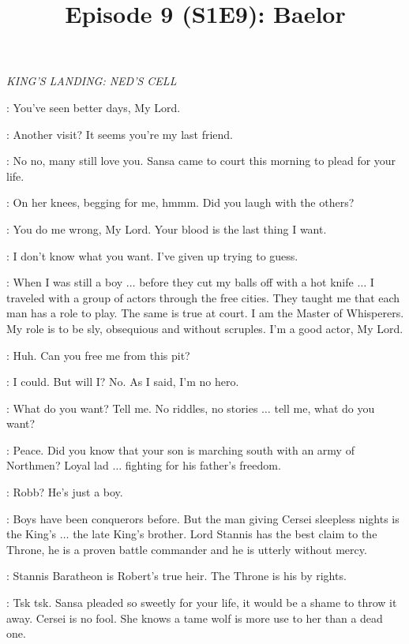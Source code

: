

\title{Episode 9 (S1E9): Baelor}
\author{}
\date{}
\maketitle




\scene

\textit{KING'S LANDING: NED'S CELL} 


\VARYS: You've seen better days, My Lord. 

\NED: Another visit? It seems you're my last friend. 

\VARYS: No no, many still love you. Sansa came to court this morning to plead for your life. 

\NED: On her knees, begging for me, hmmm. Did you laugh with the others? 

\VARYS: You do me wrong, My Lord. Your blood is the last thing I want. 

\NED: I don't know what you want. I've given up trying to guess. 

\VARYS: When I was still a boy $\ldots$ before they cut my balls off with a hot knife $\ldots$  I traveled with a group of actors through the free cities. They taught me that each man has a role to play. The same is true at court. I am the Master of Whisperers. My role is to be sly, obsequious and without scruples. I'm a good actor, My Lord. 

\NED: Huh. Can you free me from this pit? 

\VARYS: I could. But will I? No. As I said, I'm no hero. 

\NED: What do you want? Tell me. No riddles, no stories $\ldots$ tell me, what do you want? 

\VARYS: Peace. Did you know that your son is marching south with an army of Northmen? Loyal lad $\ldots$ fighting for his father's freedom. 

\NED: Robb? He's just a boy. 

\VARYS: Boys have been conquerors before. But the man giving Cersei sleepless nights is the King's $\ldots$ the late King's brother. Lord Stannis has the best claim to the Throne, he is a proven battle commander and he is utterly without mercy. 

\NED: Stannis Baratheon is Robert's true heir. The Throne is his by rights. 

\VARYS: Tsk tsk. Sansa pleaded so sweetly for your life, it would be a shame to throw it away. Cersei is no fool. She knows a tame wolf is more use to her than a dead one. 

